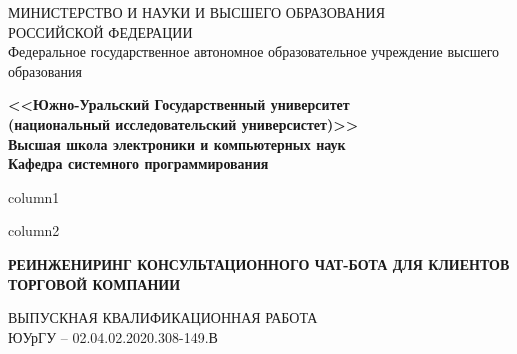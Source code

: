 \begin{titlepage}
    \begin{center}
        МИНИСТЕРСТВО И НАУКИ И ВЫСШЕГО ОБРАЗОВАНИЯ\\
        РОССИЙСКОЙ ФЕДЕРАЦИИ\\
        Федеральное государственное автономное образовательное учреждение высшего образования

        \textbf{
        <<Южно-Уральский Государственный университет\\
        (национальный исследовательский универсистет)>>\\
        Высшая школа электроники и компьютерных наук\\
        Кафедра системного программирования
        }

        
        \noindent
        \newline
        \begin{minipage}{0.4\textwidth}
            column1
        \end{minipage}
        \vspace{\fill}
        \begin{minipage}{0.4\textwidth}
            column2
        \end{minipage}

        \vfill
        \large\textbf{
            РЕИНЖЕНИРИНГ КОНСУЛЬТАЦИОННОГО ЧАТ-БОТА ДЛЯ КЛИЕНТОВ ТОРГОВОЙ КОМПАНИИ
        }        
        \bigskip
        
        ВЫПУСКНАЯ КВАЛИФИКАЦИОННАЯ РАБОТА\\
        ЮУрГУ – 02.04.02.2020.308-149.В
    \end{center}
    \vfill



\end{titlepage}
